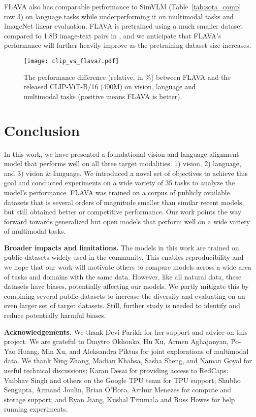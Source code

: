\documentclass[10pt,twocolumn,letterpaper]{article}
\newcommand{\myparagraph}[1]{\vspace{0.25em}\noindent\textbf{#1}}
\begin{document}
FLAVA also has comparable performance to SimVLM \cite{wang2021simvlm} (Table~\ref{tab:sota_comp} row 3) on language tasks while underperforming it on multimodal tasks and ImageNet linear evaluation. FLAVA is pretrained using a much smaller dataset compared to 1.8B image-text pairs in \cite{wang2021simvlm}, and we anticipate that FLAVA's performance will further heavily improve as the pretraining dataset size increases.

\begin{figure}[t]
\centering
\texttt{[image: clip\_vs\_flava7.pdf]}
\caption{The performance difference (relative, in \%) between FLAVA and the released CLIP-ViT-B/16 (400M) \cite{radford2021learning} on vision, language and multimodal tasks (positive means FLAVA is better).}
\vspace{-2.0em}
\label{fig:clip_vs_flava}
\end{figure}

\section{Conclusion}

In this work, we have presented a foundational vision and language alignment model that performs well on all three target modalities: 1) vision, 2) language, and 3) vision \& language. We introduced a novel set of objectives to achieve this goal and conducted experiments on a wide variety of 35 tasks to analyze the model's performance. FLAVA was trained on a corpus of publicly available datasets that is several orders of magnitude smaller than similar recent models, but still obtained better or competitive performance. Our work points the way forward towards generalized but open models that perform well on a wide variety of multimodal tasks.

\myparagraph{Broader impacts and limitations.} The models in this work are trained on public datasets widely used in the community. This enables reproducibility and we hope that our work will motivate others to compare models across a wide area of tasks and domains with the same data. However, like all natural data, these datasets have biases, potentially affecting our models. We partly mitigate this by combining several public datasets to increase the diversity and evaluating on an even larger set of target datasets. Still, further study is needed to identify and reduce potentially harmful biases. 

\small{\noindent\textbf{Acknowledgements.} We thank Devi Parikh for her support and advice on this project. We are grateful to Dmytro Okhonko, Hu Xu, Armen Aghajanyan, Po-Yao Huang, Min Xu, and Aleksandra Piktus for joint explorations of multimodal data. We thank Ning Zhang, Madian Khabsa, Sasha Sheng, and Naman Goyal for useful technical discussions; Karan Desai for providing access to RedCaps; Vaibhav Singh and others on the Google TPU team for TPU support; Shubho Sengupta, Armand Joulin, Brian O'Horo, Arthur Menezes for compute and storage support; and Ryan Jiang, Kushal Tirumala and Russ Howes for help running experiments.}
\end{document}
